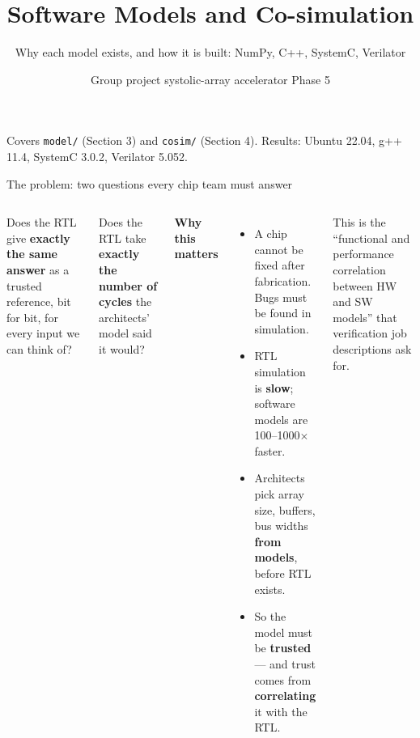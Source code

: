 \documentclass[aspectratio=169,11pt]{beamer}
\title{\textcolor{pcb}{Software Models and Co-simulation}}
\subtitle{Why each model exists, and how it is built: NumPy, C++, SystemC, Verilator}
\author{Group project \textperiodcentered{} systolic-array accelerator \textperiodcentered{} Phase 5}
\date{}
\newcommand{\file}[1]{\texttt{\textcolor{copper}{#1}}}
\begin{document}
\begin{frame}
  \titlepage
  \centering\color{muted}\small
  Covers \file{model/} (Section 3) and \file{cosim/} (Section 4).
  Results: Ubuntu 22.04, g++ 11.4, SystemC 3.0.2, Verilator 5.052.
\end{frame}

\begin{frame}{The problem: two questions every chip team must answer}
  \begin{columns}[T]
    \begin{tcolorbox}[colback=coppert,colframe=copper,arc=2mm,title=\textbf{1. Is the hardware correct?},coltitle=white]
      \small Does the RTL give \textbf{exactly the same answer} as a trusted reference,
      bit for bit, for every input we can think of?
    \end{tcolorbox}
    \begin{tcolorbox}[colback=tint,colframe=pcbmid,arc=2mm,title=\textbf{2. Is it as fast as predicted?},coltitle=white]
      \small Does the RTL take \textbf{exactly the number of cycles} the architects'
      model said it would?
    \end{tcolorbox}
    \small
    \textbf{Why this matters}
    \begin{itemize}
      \item A chip cannot be fixed after fabrication. Bugs must be found in simulation.
      \item RTL simulation is \textbf{slow}; software models are 100--1000$\times$ faster.
      \item Architects pick array size, buffers, bus widths \textbf{from models}, before RTL exists.
      \item So the model must be \textbf{trusted} --- and trust comes from
            \textbf{correlating} it with the RTL.
    \end{itemize}
    \vspace{1mm}
    \footnotesize\color{muted}This is the ``functional and performance correlation between HW
    and SW models'' that verification job descriptions ask for.
  \end{columns}
\end{frame}
\end{document}
